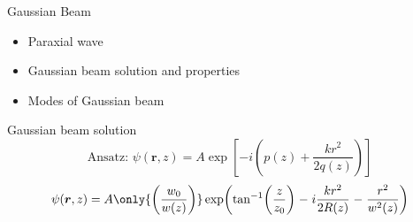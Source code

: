 \documentclass[12pt, dvipsnames]{beamer}
\numberwithin{equation}{section}
\begin{document}
\begin{frame}
	\centering
	\alert{\huge Gaussian Beam}
	\begin{itemize}\Large
		\item<0>Paraxial wave
		\item<1>Gaussian beam solution and properties
		\item<0>Modes of Gaussian beam
	\end{itemize}
\end{frame}

\begin{frame}[t]{Gaussian beam solution }\vspace{-16pt}
	$$\text{Ansatz: }\psi(\boldsymbol{r},z)= A \exp\left[-i\left(p(z) + \frac{kr^2}{2q(z)}\right)\right]$$\pause
	$$\psi(\boldsymbol{r},z)=A
	\only{\left(\frac{w_0}{w(z)}\right)}
	\exp(
	{\tan[-1](\frac{z}{z_0})}\;
	{-\;i\frac{kr^2}{2R(z)}}\;
	{-\;\frac{r^2}{w^2(z)}}
	)$$\pause
	
\end{frame}
\end{document}
